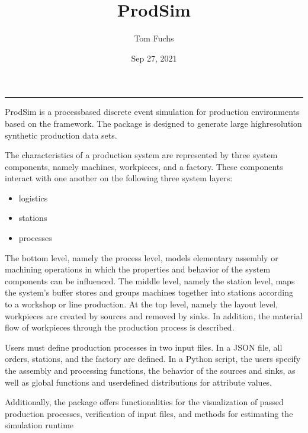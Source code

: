 \documentclass[letterpaper,10pt,english]{sphinxmanual}
\title{ProdSim}
\date{Sep 27, 2021}
\author{Tom Fuchs}
\begin{document}
\pagestyle{empty}
\sphinxmaketitle
\pagestyle{plain}
\sphinxtableofcontents
\pagestyle{normal}
\label{\detokenize{index::doc}}
\noindent{}


\bigskip\hrule\bigskip




\sphinxAtStartPar
ProdSim is a process\sphinxhyphen{}based discrete event simulation for production environments based on the
 framework. The package is designed to generate large high\sphinxhyphen{}resolution
synthetic production data sets.

\sphinxAtStartPar
The characteristics of a production system are represented by three system components, namely machines, workpieces, and
a factory. These components interact with one another on the following three system layers:
\begin{itemize}
\item {} 
\sphinxAtStartPar
logistics

\item {} 
\sphinxAtStartPar
stations

\item {} 
\sphinxAtStartPar
processes

\end{itemize}

\sphinxAtStartPar
The bottom level, namely the process level, models elementary assembly or machining operations in which the properties
and behavior of the system components can be influenced. The middle level, namely the station level, maps the system’s
buffer stores and groups machines together into stations according to a workshop or line production. At the top level,
namely the layout level, workpieces are created by sources and removed by sinks. In addition, the material flow of
workpieces through the production process is described.

\sphinxAtStartPar
Users must define production processes in two input files. In a JSON file, all orders, stations, and the factory are
defined. In a Python script, the users specify the assembly and processing functions, the behavior of the sources and
sinks, as well as global functions and user\sphinxhyphen{}defined distributions for attribute values.

\sphinxAtStartPar
Additionally, the package offers functionalities for the visualization of passed production processes, verification of
input files, and methods for estimating the simulation runtime
\end{document}
